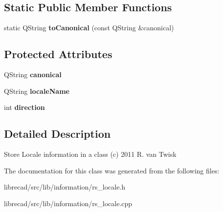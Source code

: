 \subsection*{Static Public Member Functions}
\begin{DoxyCompactItemize}
\item 
\hypertarget{classRS__Locale_aab13464613b2bd42901988c9deb288ef}{static Q\-String {\bfseries to\-Canonical} (const Q\-String \&canonical)}\label{classRS__Locale_aab13464613b2bd42901988c9deb288ef}

\end{DoxyCompactItemize}
\subsection*{Protected Attributes}
\begin{DoxyCompactItemize}
\item 
\hypertarget{classRS__Locale_ac052ffccdf1026f47c7b179041d567e3}{Q\-String {\bfseries canonical}}\label{classRS__Locale_ac052ffccdf1026f47c7b179041d567e3}

\item 
\hypertarget{classRS__Locale_a321b2baf11ba039f6f073c0308a671c3}{Q\-String {\bfseries locale\-Name}}\label{classRS__Locale_a321b2baf11ba039f6f073c0308a671c3}

\item 
\hypertarget{classRS__Locale_a774b0479806a5bf04a513752095ad55d}{int {\bfseries direction}}\label{classRS__Locale_a774b0479806a5bf04a513752095ad55d}

\end{DoxyCompactItemize}


\subsection{Detailed Description}
Store Locale information in a class (c) 2011 R. van Twisk 

The documentation for this class was generated from the following files\-:\begin{DoxyCompactItemize}
\item 
librecad/src/lib/information/rs\-\_\-locale.\-h\item 
librecad/src/lib/information/rs\-\_\-locale.\-cpp\end{DoxyCompactItemize}
